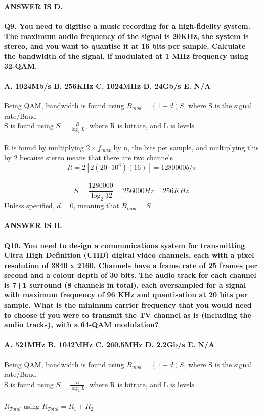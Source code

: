 \documentclass[12pt]{article}
\begin{document}
\textbf{ANSWER IS D.}\\
\\
\textbf{Q9. You need to digitise a music recording for a high-fidelity system. The maximum audio frequency of the signal is 20KHz, the system is stereo, and you want to quantise it at 16 bits per sample. Calculate the bandwidth of the signal, if modulated at 1 MHz frequency using 32-QAM.\\
\\
A. 1024Mb/s B. 256KHz C. 1024MHz D. 24Gb/s E. N/A}\\
\\
Being QAM, bandwidth is found using \(B_{mod} = (1 + d)S\), where S is the signal rate/Baud\\
S is found using \(S = \frac{R}{\log_2L}\), where R is bitrate, and L is levels\\
\\
R is found by multiplying \(2 \times f_{max}\) by n, the bits per sample, and multiplying this by 2 because stereo means that there are two channels\\
\[R = 2[2(20\cdot 10^3)(16)] = 1280000b/s\]\
\[S = \frac{1280000}{\log_2 32} = 256000Hz = 256KHz\]
Unless specified, \(d = 0\), meaning that \(B_{mod} = S\)\\
\\
\textbf{ANSWER IS B.}\\
\\
\textbf{Q10. You need to design a communications system for transmitting Ultra High Definition (UHD) digital video channels, each with a pixel resolution of 3840 x 2160. Channels have a frame rate of 25 frames per second and a colour depth of 30 bits. The audio track for each channel is 7+1 surround (8 channels in total), each oversampled for a signal with maximum frequency of 96 KHz and quantisation at 20 bits per sample. What is the minimum carrier frequency that you would need to choose if you were to transmit the TV channel as is (including the audio tracks), with a 64-QAM modulation?\\
\\
A. 521MHz B. 1042MHz C. 260.5MHz D. 2.2Gb/s E. N/A}\\
\\
Being QAM, bandwidth is found using \(B_{mod} = (1 + d)S\), where S is the signal rate/Baud\\
S is found using \(S = \frac{R}{\log_2L}\), where R is bitrate, and L is levels\\
\\
\(R_{Total}\) using \(R_{Total} = R_1 + R_2\)\\
\end{document}
